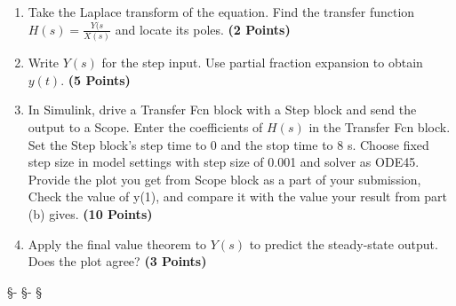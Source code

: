 \documentclass[12pt, xcolor=dvipsnames,svgnames,x11names]{article}
\begin{document}
\begin{enumerate}

\item Take the Laplace transform of the equation. Find the transfer function $H(s) = \frac{Y(s}{X(s)}$ and locate its poles. \textbf{\hfill (2 Points)}

\item Write $Y(s)$ for the step input. Use partial fraction expansion to obtain $y(t)$. \textbf{\hfill (5 Points)}

\item In Simulink, drive a Transfer Fcn block with a Step block and send the output to a Scope. Enter the coefficients of $H(s)$ in the Transfer Fcn block. Set the Step block’s step time to 0 and the stop time to 8 s. Choose fixed step size in model settings with step size of 0.001 and solver as ODE45. Provide the plot you get from Scope block as a part of your submission, Check the value of y(1), and compare it with the value your result from part (b) gives. \textbf{\hfill (10 Points)}

\item Apply the final value theorem to $Y(s)$ to predict the steady-state output. Does the plot agree? \textbf{\hfill (3 Points)}


\end{enumerate}


\begin{center}
   \S - \S - \S
\end{center}
\end{document}
